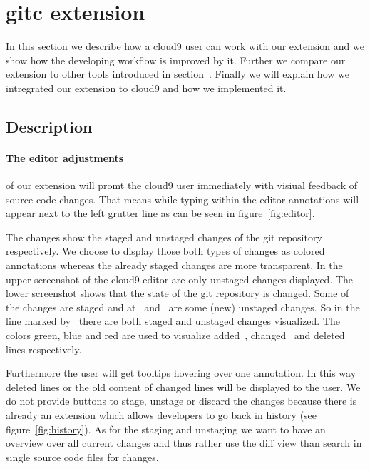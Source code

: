 \section{gitc extension}
\label{sec:Extension}
In this section we describe how a cloud9 user can work with our extension and we show how the developing workflow is improved by it.
Further we compare our extension to other tools introduced in section~.
Finally we will explain how we intregrated our extension to cloud9 and how we implemented it.

\subsection{Description}
\paragraph{The editor adjustments} of our extension will promt the cloud9 user immediately with visiual feedback of source code changes.
That means while typing within the editor annotations will appear next to the left grutter line as can be seen in figure~\ref{fig:editor}.

The changes show the staged and unstaged changes of the git repository respectively.
We choose to display those both types of changes as colored annotations whereas the already staged changes are more transparent.
In the upper screenshot of the cloud9 editor are only unstaged changes displayed.
The lower screenshot shows that the state of the git repository is changed.
Some of the changes are staged and at~ and~ are some (new) unstaged changes.
So in the line marked by~ there are both staged and unstaged changes visualized.
The colors green, blue and red are used to visualize added~, changed~ and deleted~ lines respectively.

Furthermore the user will get tooltips hovering over one annotation.
In this way deleted lines or the old content of changed lines will be displayed to the user.
We do not provide buttons to stage, unstage or discard the changes because there is already an extension which allows developers to go back in history (see figure~\ref{fig:history}).
As for the staging and unstaging we want to have an overview over all current changes and thus rather use the diff view than search in single source code files for changes.

